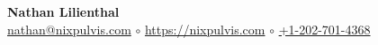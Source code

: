 \begin{center}
    \huge \textbf{Nathan Lilienthal} \\
    \large
    \href{mailto:nathan@nixpulvis.com}{nathan@nixpulvis.com}
    $\circ$
    \url{https://nixpulvis.com}
    $\circ$
    \href{tel:12027014368}{+1-202-701-4368}
    \vspace{-0.2em}
\end{center}
